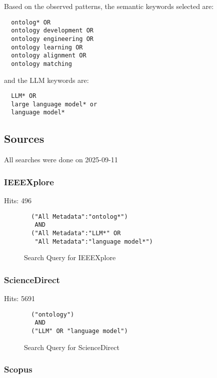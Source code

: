 \documentclass[a4paper,colorinlistoftodos]{article}
\begin{document}
Based on the observed patterns, the semantic keywords selected are:
\begin{lstlisting}
  ontolog* OR
  ontology development OR
  ontology engineering OR
  ontology learning OR
  ontology alignment OR
  ontology matching
\end{lstlisting}

and the LLM keywords are:
\begin{lstlisting}
  LLM* OR
  large language model* or
  language model*
\end{lstlisting}

\subsection{Sources}
\label{subsec:sources}

All searches were done on 2025-09-11

\subsubsection{IEEEXplore}
\label{subsubsec:ieeexplore}

Hits: 496

\begin{figure}[H]
\begin{lstlisting}
  ("All Metadata":"ontolog*")
   AND
  ("All Metadata":"LLM*" OR
   "All Metadata":"language model*")
\end{lstlisting}
  \label{fig:ieeexplore-query}
  \caption{Search Query for IEEEXplore}
\end{figure}

\subsubsection{ScienceDirect}
\label{subsubsec:sciencedirect}

Hits: 5691 \newline

\begin{figure}[H]
\begin{lstlisting}
  ("ontology")
   AND
  ("LLM" OR "language model")
\end{lstlisting}
  \label{fig:sciencedirect-query}
  \caption{Search Query for ScienceDirect}
\end{figure}

\subsubsection{Scopus}
\label{subsubsec:scopus}
\end{document}
